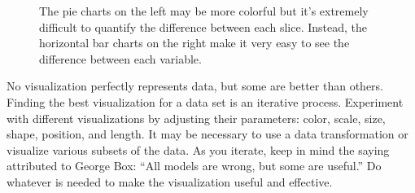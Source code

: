 \begin{figure}[H]
\begin{subfigure}{.49\textwidth}
    \end{subfigure}
    \caption{The pie charts on the left may be more colorful but it's extremely difficult to quantify the difference between each slice. Instead, the horizontal bar charts on the right make it very easy to see the difference between each variable.}
    \label{fig:piebar}
\end{figure}

No visualization perfectly represents data, but some are better than others.
Finding the best visualization for a data set is an iterative process.
Experiment with different visualizations by adjusting their parameters: color, scale, size, shape, position, and length.
It may be necessary to use a data transformation or visualize various subsets of the data.
As you iterate, keep in mind the saying attributed to George Box: ``All models are wrong, but some are useful.''
Do whatever is needed to make the visualization useful and effective.

